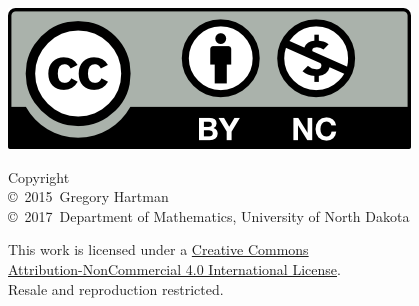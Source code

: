 
\noindent\hspace{-1in}\begin{minipage}{2in}
\href{http://creativecommons.org/licenses/by-nc/4.0/}{\includegraphics{figures/by-nc}}
\end{minipage}%
\begin{minipage}{3in}\raggedright
\noindent Copyright\\
\copyright~2015~Gregory Hartman\\
\copyright~2017~Department of Mathematics, University of North Dakota

This work is licensed under a \href{http://creativecommons.org/licenses/by-nc/4.0/}{Creative Commons\\Attribution-NonCommercial 4.0 International License}.\\
Resale and reproduction restricted.
\end{minipage}

